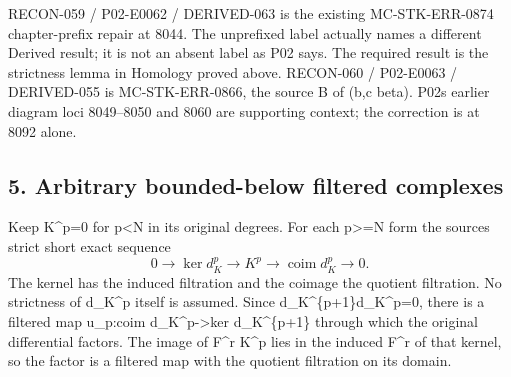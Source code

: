 RECON-059 /\allowbreak{} P02-E0062 /\allowbreak{} DERIVED-063 is the existing MC-STK-ERR-0874 chapter-prefix repair at 8044. The unprefixed label actually names a different Derived result; it is not an absent label as P02 says. The required result is the strictness lemma in Homology proved above. RECON-060 /\allowbreak{} P02-E0063 /\allowbreak{} DERIVED-055 is MC-STK-ERR-0866,\allowbreak{} the source B of (b,\allowbreak{}c beta)\allowbreak{}. P02\textquotesingle s earlier diagram loci 8049–\allowbreak{}8050 and 8060 are supporting context; the correction is at 8092 alone.

\subsection{5. Arbitrary bounded-below filtered complexes}\label{proofs-7589-8350-arbitrary-bounded-below-filtered-complexes}

Keep K\textasciicircum{}p\allowbreak{}=0 for p\textless N in its original degrees. For each p>\allowbreak{}=N form the source\textquotesingle s strict short exact sequence \[
 0\to\ker d_K^p\to K^p
       \to\operatorname{coim}d_K^p\to0.                      \tag{5.1}
\] The kernel has the induced filtration and the coimage the quotient filtration. No strictness of d\_\allowbreak{}K\textasciicircum{}p itself is assumed. Since d\_\allowbreak{}K\textasciicircum{}\{p\allowbreak{}+1\}d\_\allowbreak{}K\textasciicircum{}p\allowbreak{}=0,\allowbreak{} there is a filtered map u\_\allowbreak{}p:\allowbreak{}coim d\_\allowbreak{}K\textasciicircum{}p\allowbreak{}->ker d\_\allowbreak{}K\textasciicircum{}\{p\allowbreak{}+1\} through which the original differential factors. The image of F\^{}r K\^{}p lies in the induced F\^{}r of that kernel,\allowbreak{} so the factor is a filtered map with the quotient filtration on its domain.

